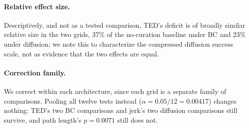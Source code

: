 \documentclass[10pt]{article}
\begin{document}
\paragraph{Relative effect size.} Descriptively, and not as a tested
comparison, TED's deficit is of broadly similar relative size in the two
grids, 37\% of the no-curation baseline under BC and 23\% under diffusion;
we note this to characterize the compressed diffusion success scale, not as
evidence that the two effects are equal.

\paragraph{Correction family.} We correct within each architecture, since
each grid is a separate family of comparisons. Pooling all twelve tests
instead ($\alpha = 0.05/12 = 0.00417$) changes nothing: TED's two BC
comparisons and jerk's two diffusion comparisons still survive, and path
length's $p = 0.0071$ still does not.
\end{document}
